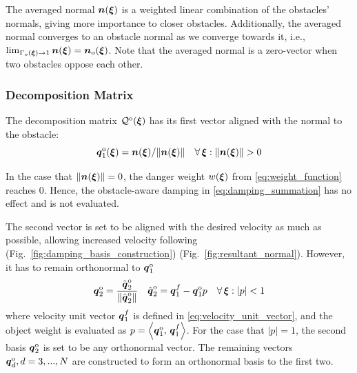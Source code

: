 The averaged normal $\boldsymbol{n}(\boldsymbol{\xi})$ is a weighted linear combination of the obstacles' normals, giving more importance to closer obstacles.
Additionally, the averaged normal converges to an obstacle normal as we converge towards it, i.e., $\lim_{\Gamma_o(\boldsymbol{\xi}) \rightarrow 1} \boldsymbol{n}(\boldsymbol{\xi}) = \boldsymbol{n}_o(\boldsymbol{\xi})$.
Note that the averaged normal is a zero-vector when two obstacles oppose each other. 

\subsubsection{Decomposition Matrix}
The decomposition matrix $\mathcal{Q}^{\mathrm{o}}(\boldsymbol{\xi})$ has its first vector aligned with the normal to the obstacle: 
\begin{equation}
    \boldsymbol{q}_1^{\mathrm{o}}(\boldsymbol{\xi}) =  \boldsymbol{n}(\boldsymbol{\xi}) / \lVert\boldsymbol{n}(\boldsymbol{\xi})\rVert 
    \quad \forall \, \boldsymbol{\xi} : \lVert\boldsymbol{n}(\boldsymbol{\xi})\rVert  > 0
    \label{eq:first_obstacle_basis}
\end{equation}

In the case that $\lVert\boldsymbol{n}(\boldsymbol{\xi})\rVert = 0$, the danger weight $w(\boldsymbol{\xi})$ from \eqref{eq:weight_function} reaches 0. Hence, the obstacle-aware damping in \eqref{eq:damping_summation} has no effect and is not evaluated.


The second vector is set to be aligned with the desired velocity as much as possible, allowing increased velocity following \iflong (Fig.~\ref{fig:damping_basis_construction}) \else (Fig.~\ref{fig:resultant_normal})\fi. However, it has to remain orthonormal to $\boldsymbol{q}_1^{\mathrm{o}}$
\begin{equation}
  \boldsymbol{q}_2^{\mathrm{o}} = \frac{\hat{\boldsymbol{q}}_2^{\mathrm{o}}}{\| \hat{\boldsymbol{q}}_2^{\mathrm{o}} \|}
  \quad
  \hat{\boldsymbol{q}}_2^{\mathrm{o}} = \boldsymbol{q}_1^{f} - \boldsymbol{q}_1^{\mathrm{o}} p \quad  \forall \, \boldsymbol{\xi} : | p | < 1
\end{equation}
where velocity unit vector $\boldsymbol{q}_1^{f}$ is defined in \eqref{eq:velocity_unit_vector}, and the object weight is evaluated as $p = \left\langle {\boldsymbol{q}_1^{\mathrm{o}}}, \, {\boldsymbol{q}_1^{f}} \right\rangle$. 
For the case that $| p | = 1$, the second basis $\boldsymbol{q}_2^{\mathrm{o}}$ is set to be any orthonormal vector. The remaining vectors $\boldsymbol{q}_d^{\mathrm{o}}, d = 3, ..., N$ are constructed to form an orthonormal basis to the first two.


